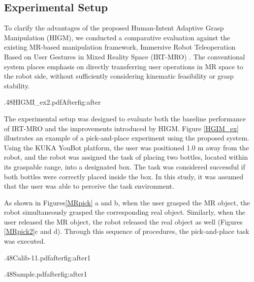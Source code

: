 \documentclass[../../main.tex]{subfiles} %
\begin{document}
\subsection{Experimental Setup}
To clarify the advantages of the proposed Human-Intent Adaptive Grasp Manipulation 
(HIGM), we conducted a comparative evaluation against the existing MR-based 
manipulation framework, Immersive Robot Teleoperation Based on User Gestures 
in Mixed Reality Space (IRT-MRO) \cite{Esaki}. 
The conventional system places emphasis on directly transferring user operations 
in MR space to the robot side, without sufficiently considering kinematic feasibility 
or grasp stability.

  {.48\linewidth}{HIGMI_ex2.pdf}{After}{fig:after}
\label{HGIM_ex}


The experimental setup was designed to evaluate both the baseline performance of 
IRT-MRO and the improvements introduced by HIGM. Figure \ref{HGIM_ex} 
illustrates an example 
of a pick-and-place experiment using the proposed system. Using the KUKA YouBot 
platform, the user was positioned 1.0 m away from the robot, 
and the robot was 
assigned the task of placing two bottles, located within its 
graspable range, 
into a designated box. The task was considered successful if both bottles were 
correctly placed inside the box. In this study, it was assumed that the user 
was able to perceive the task environment.

As shown in Figures\ref{MRpick} a and b, when the user grasped the MR object, 
the robot simultaneously grasped the corresponding real object. 
Similarly, when the user released the MR object, 
the robot released the real object as well (Figures \ref{MRpick2}c and d). 
Through this sequence of procedures, the pick-and-place task was executed.

  {.48\linewidth}{Calib-11.pdf}{after}{fig:after1}
\label{MRpick}

  {.48\linewidth}{Sample.pdf}{after}{fig:after1}
\label{MRpick2}
\end{document}
